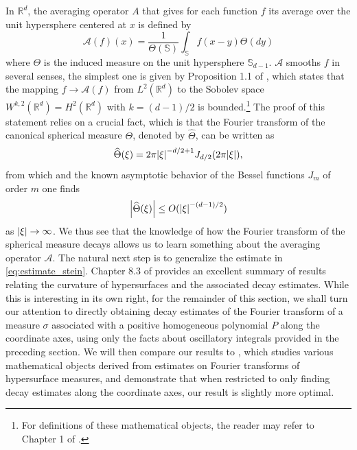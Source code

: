 \documentclass[11pt, letter]{book}
\newcommand{\f}[2]{\frac{#1}{#2}}
\begin{document}
\noindent In $\mathbb{R}^d$, the averaging operator $A$ that gives for each function $f$ its average over the unit hypersphere centered at $x$ is defined by
\begin{equation*}
    \mathcal{A}(f)(x)=\f{1}{\Theta(\mathbb{S})}\int_{\mathbb{S}}f(x-y)\Theta(dy)
\end{equation*}
where $\Theta$ is the induced measure on the unit hypersphere $\mathbb{S}_{d-1}$. $\mathcal{A}$ smooths $f$ in several senses, the simplest one is given by Proposition 1.1 of \cite{SteinFunctionalAnalysis}, which states that the mapping $f\to \mathcal{A}(f)$ from $L^2(\mathbb{R}^d)$ to the Sobolev space $W^{k,2}(\mathbb{R}^d)=H^2(\mathbb{R}^d)$ with $k=(d-1)/2$ is bounded.\footnote{For definitions of these mathematical objects, the reader may refer to Chapter 1 of \cite{SteinFunctionalAnalysis}.} The proof of this statement relies on a crucial fact, which is that the Fourier transform of the canonical spherical measure $\Theta$, denoted by $\widehat{\Theta}$, can be written as
\begin{equation*}
    \widehat{\Theta}(\xi) = 2\pi \abs{\xi}^{-d/2+1}J_{d/2}(2\pi \abs{\xi}),
\end{equation*}
from which and the known asymptotic behavior of the Bessel functions $J_m$ of order $m$ one finds 
\begin{equation}\label{eq:estimate_stein}
    \abs{\widehat{\Theta}(\xi)} \leq O(\abs{\xi}^{-(d-1)/2})
\end{equation}
as $\abs{\xi} \to\infty$. We thus see that the knowledge of how the Fourier transform of the spherical measure decays allows us to learn something about the averaging operator $\mathcal{A}$. The natural next step is to generalize the estimate in \eqref{eq:estimate_stein}. Chapter 8.3 of \cite{SteinFunctionalAnalysis} provides an excellent summary of results relating the curvature of hypersurfaces and the associated decay estimates. While this is interesting in its own right, for the remainder of this section, we shall turn our attention to directly obtaining decay estimates of the Fourier transform of a measure $\sigma$ associated with a positive homogeneous polynomial $P$ along the coordinate axes, using only the facts about oscillatory integrals provided in the preceding section. We will then compare our results to \cite{greenblatt_fourier_2021}, which studies various mathematical objects derived from estimates on Fourier transforms of hypersurface measures, and demonstrate that when restricted to only finding decay estimates along the coordinate axes, our result is slightly more optimal. \\
\end{document}
